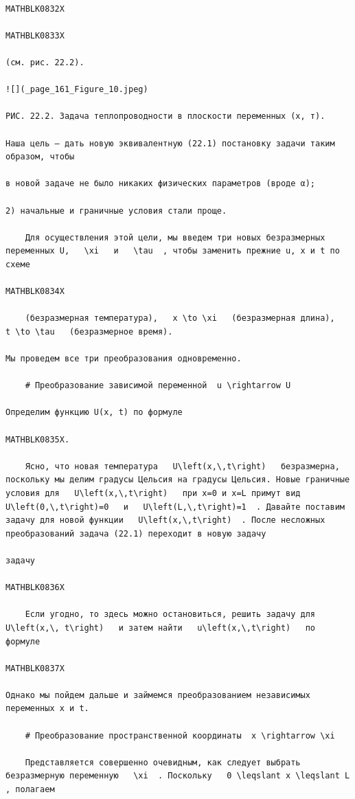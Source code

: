 \documentclass[
]{article}
\begin{document}
\begin{verbatim}

MATHBLK0832X

MATHBLK0833X

(см. рис. 22.2).

![](_page_161_Figure_10.jpeg)

РИС. 22.2. Задача теплопроводности в плоскости переменных (х, т).

Наша цель — дать новую эквивалентную (22.1) постановку задачи таким образом, чтобы

в новой задаче не было никаких физических параметров (вроде α);

2) начальные и граничные условия стали проще.

    Для осуществления этой цели, мы введем три новых безразмерных переменных U,   \xi   и   \tau  , чтобы заменить прежние u, x и t по схеме

MATHBLK0834X

    (безразмерная температура),   x \to \xi   (безразмерная длина),   t \to \tau   (безразмерное время).

Мы проведем все три преобразования одновременно.

    # Преобразование зависимой переменной  u \rightarrow U 

Определим функцию U(x, t) по формуле

MATHBLK0835X.

    Ясно, что новая температура   U\left(x,\,t\right)   безразмерна, поскольку мы делим градусы Цельсия на градусы Цельсия. Новые граничные условия для   U\left(x,\,t\right)   при x=0 и x=L примут вид   U\left(0,\,t\right)=0   и   U\left(L,\,t\right)=1  . Давайте поставим задачу для новой функции   U\left(x,\,t\right)  . После несложных преобразований задача (22.1) переходит в новую задачу

задачу

MATHBLK0836X

    Если угодно, то здесь можно остановиться, решить задачу для   U\left(x,\, t\right)   и затем найти   u\left(x,\,t\right)   по формуле

MATHBLK0837X

Однако мы пойдем дальше и займемся преобразованием независимых переменных x и t.

    # Преобразование пространственной координаты  x \rightarrow \xi 

    Представляется совершенно очевидным, как следует выбрать безразмерную переменную   \xi  . Поскольку   0 \leqslant x \leqslant L  , полагаем


\end{verbatim}
\end{document}
